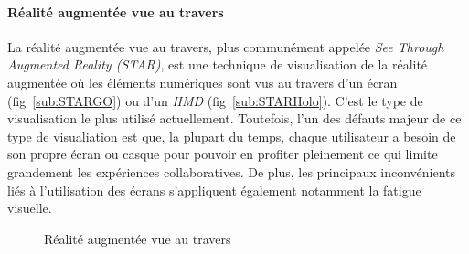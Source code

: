 \paragraph{Réalité augmentée vue au travers}
La réalité augmentée vue au travers, plus communément appelée \emph{See Through Augmented Reality (STAR)}, est une technique de visualisation de la réalité augmentée où les éléments numériques sont vus au travers d'un écran (fig~\ref{sub:STARGO}) ou d'un \emph{HMD} (fig~\ref{sub:STARHolo}). C'est le type de visualisation le plus utilisé actuellement. Toutefois, l'un des défauts majeur de ce type de visualiation est que, la plupart du temps, chaque utilisateur a besoin de son propre écran ou casque pour pouvoir en profiter pleinement ce qui limite grandement les expériences collaboratives. De plus, les principaux inconvénients liés à l'utilisation des écrans s'appliquent également notamment la fatigue visuelle.  

\begin{figure}[H]
    \centering
\caption{Réalité augmentée vue au travers}
\label{fig:STAR}
\end{figure}

